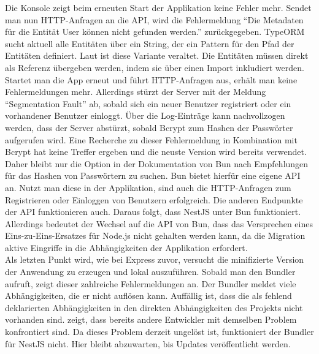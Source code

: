 \noindent
Die Konsole zeigt beim erneuten Start der Applikation keine Fehler mehr. Sendet man nun HTTP-Anfragen an die API, wird die Fehlermeldung ``Die Metadaten für die Entität User können nicht gefunden werden.'' zurückgegeben. TypeORM sucht aktuell alle Entitäten über ein String, der ein Pattern für den Pfad der Entitäten definiert. Laut \cite{TypeORM.2021} ist diese Variante veraltet. Die Entitäten müssen direkt als Referenz übergeben werden, indem sie über einen Import inkludiert werden. \newline
Startet man die App erneut und führt HTTP-Anfragen aus, erhält man keine Fehlermeldungen mehr. Allerdings stürzt der Server mit der Meldung ``Segmentation Fault'' ab, sobald sich ein neuer Benutzer registriert oder ein vorhandener Benutzer einloggt. Über die Log-Einträge kann nachvollzogen werden, dass der Server abstürzt, sobald Bcrypt zum Hashen der Passwörter aufgerufen wird. Eine Recherche zu dieser Fehlermeldung in Kombination mit Bcrypt hat keine Treffer ergeben und die neuste Version wird bereits verwendet. Daher bleibt nur die Option in der Dokumentation von Bun nach Empfehlungen für das Hashen von Passwörtern zu suchen. Bun bietet hierfür eine eigene API an. Nutzt man diese in der Applikation, sind auch die HTTP-Anfragen zum Registrieren oder Einloggen von Benutzern erfolgreich. Die anderen Endpunkte der API funktionieren auch. Daraus folgt, dass NestJS unter Bun funktioniert. Allerdings bedeutet der Wechsel auf die API von Bun, dass das Versprechen eines Eins-zu-Eins-Ersatzes für Node.js nicht gehalten werden kann, da die Migration aktive Eingriffe in die Abhängigkeiten der Applikation erfordert.\\

\noindent
Als letzten Punkt wird, wie bei Express zuvor, versucht die minifizierte Version der Anwendung zu erzeugen und lokal auszuführen. Sobald man den Bundler aufruft, zeigt dieser zahlreiche Fehlermeldungen an. Der Bundler meldet viele Abhängigkeiten, die er nicht auflösen kann.  Auffällig ist, dass die als fehlend deklarierten Abhängigkeiten in den direkten Abhängigkeiten des Projekts nicht vorhanden sind. \cite{Postek.2023} zeigt, dass bereits andere Entwickler mit demselben Problem konfrontiert sind. Da dieses Problem derzeit ungelöst ist, funktioniert der Bundler für NestJS nicht. Hier bleibt abzuwarten, bis Updates veröffentlicht werden.

